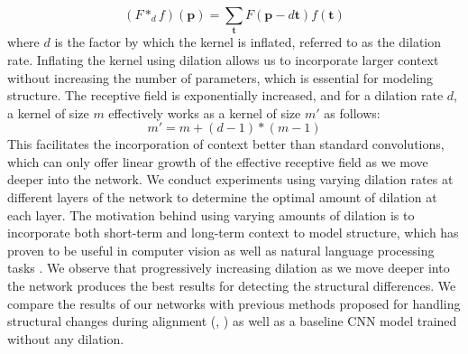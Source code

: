 \documentclass{article}
\begin{document}
\begin{equation}
(F*_df)(\textbf{p}) = \sum\limits_{\textbf{t}}F(\textbf{p}-d\textbf{t})f(\textbf{t})
\end{equation}
where $d$ is the factor by which the kernel is inflated, referred to as the dilation rate. Inflating the kernel using dilation allows us to incorporate larger context without increasing the number of parameters, which is essential for modeling structure. The receptive field is exponentially increased, and for a dilation rate $d$, a kernel of size $m$ effectively works as a kernel of size $m'$  as follows:
\vspace{-0.1cm}
\begin{equation} m' = m + (d-1)*(m-1) 
\end{equation} This facilitates the incorporation of context better than standard convolutions, which can only offer linear growth of the effective receptive field as we move deeper into the network. We conduct experiments using varying dilation rates at different layers of the network to determine the optimal amount of dilation at each layer. The motivation behind using varying amounts of dilation is to incorporate both short-term and long-term context to model structure, 
which has proven to be useful in computer vision as well as natural language processing tasks \cite{lee2017going, agrawal2018contextual}.
We observe that progressively increasing dilation as we move deeper into the network produces the best results for detecting the structural differences. We compare the results of our networks with previous methods proposed for handling structural changes during alignment (\cite{Fremerey2010handling}, \cite{grachten2013automatic}) as well as a baseline CNN model trained without any dilation.  
\begin{comment}
\par We train our models to detect synchronous subpaths from the cross-similarity matrix between the score and  the performance. These subpaths are detected by means of ``inflection points", which encode the positions of mismatch between the two audio streams. 
\end{comment}
\end{document}
